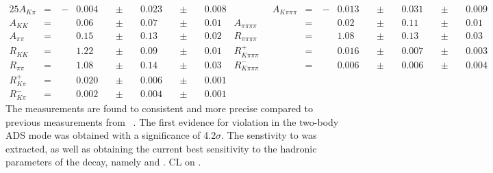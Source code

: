 \begin{alignat*}{25}
A_{K\pi} &= &\ -&0.004&\ &\pm&\ &0.023&\ &\pm&\ &0.008& \qquad\qquad
A_{K\pi\pi\pi} &= &\ -&0.013&\ &\pm&\ &0.031&\ &\pm&\ &0.009& \\
A_{KK} &= &&0.06&\ &\pm&\ &0.07&\ &\pm&\ &0.01& 
A_{\pi\pi\pi\pi} &= &&0.02&\ &\pm&\ &0.11&\ &\pm&\ &0.01& \\
A_{\pi\pi} &= &&0.15&\ &\pm&\ &0.13&\ &\pm&\ &0.02& 
R_{\pi\pi\pi\pi} &= &&1.08&\ &\pm&\ &0.13&\ &\pm&\ &0.03& \\
R_{KK} &= &&1.22&\ &\pm&\ &0.09&\ &\pm&\ &0.01& 
R^+_{K\pi\pi\pi} &= &&0.016&\ &\pm&\ &0.007&\ &\pm&\ &0.003& \\
R_{\pi\pi} &= &&1.08&\ &\pm&\ &0.14&\ &\pm&\ &0.03& 
R^-_{K\pi\pi\pi} &= &&0.006&\ &\pm&\ &0.006&\ &\pm&\ &0.004& \\
R^+_{K\pi} &= &&0.020&\ &\pm&\ &0.006&\ &\pm&\ &0.001& &&&&&&&&&&&&\\ 
R^-_{K\pi} &= &&0.002&\ &\pm&\ &0.004&\ &\pm&\ &0.001& &&&&&&&&&&&&
\end{alignat*} 
The measurements are found to consistent and more precise compared to previous measurements from \babar~\cite{BaBarDKstar}. The first evidence for \CP violation in the two-body ADS mode was obtained with a significance of 4.2$\sigma$. The senstivity to \Pgamma was extracted, as well as obtaining the current best sensitivity to the hadronic parameters of the \Bm decay, namely \rb and \deltab. CL on \Pgamma.

